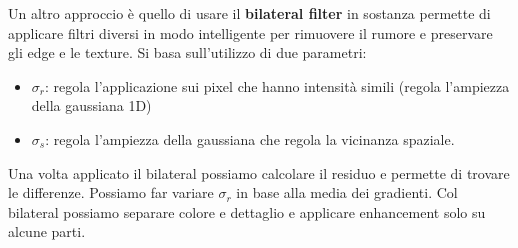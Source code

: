 Un altro approccio è quello di usare il \textbf{bilateral filter} in sostanza permette 
di applicare filtri diversi in modo intelligente per rimuovere il rumore e preservare 
gli edge e le texture. Si basa sull'utilizzo di due parametri:
\begin{itemize}
    \item $\sigma_r$: regola l'applicazione sui pixel che hanno intensità simili 
    (regola l'ampiezza della gaussiana 1D)
    \item $\sigma_s$: regola l'ampiezza della gaussiana che regola la vicinanza spaziale.
\end{itemize}

Una volta applicato il bilateral possiamo calcolare il residuo e permette di trovare 
le differenze. Possiamo far variare $\sigma_r$ in base alla media dei gradienti.
Col bilateral possiamo separare colore e dettaglio e applicare enhancement solo su 
alcune parti.